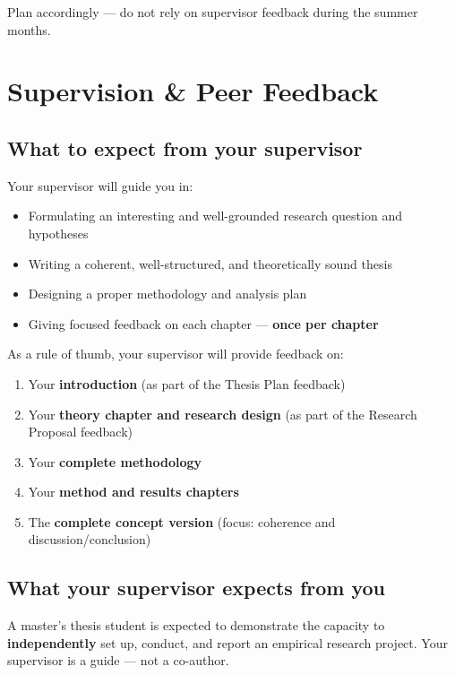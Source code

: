 \documentclass[
  11pt,
  a4paper,
]{scrbook}
\providecommand{\tightlist}{%
  \setlength{\itemsep}{0pt}\setlength{\parskip}{0pt}}\usepackage{longtable,booktabs,array}
\begin{document}
Plan accordingly --- do not rely on supervisor feedback during the
summer months.

\chapter{Supervision \& Peer Feedback}\label{supervision-peer-feedback}

\section{What to expect from your
supervisor}\label{what-to-expect-from-your-supervisor}

Your supervisor will guide you in:

\begin{itemize}
\tightlist
\item
  Formulating an interesting and well-grounded research question and
  hypotheses
\item
  Writing a coherent, well-structured, and theoretically sound thesis
\item
  Designing a proper methodology and analysis plan
\item
  Giving focused feedback on each chapter --- \textbf{once per chapter}
\end{itemize}

As a rule of thumb, your supervisor will provide feedback on:

\begin{enumerate}
\def\labelenumi{\arabic{enumi}.}
\tightlist
\item
  Your \textbf{introduction} (as part of the Thesis Plan feedback)
\item
  Your \textbf{theory chapter and research design} (as part of the
  Research Proposal feedback)
\item
  Your \textbf{complete methodology}
\item
  Your \textbf{method and results chapters}
\item
  The \textbf{complete concept version} (focus: coherence and
  discussion/conclusion)
\end{enumerate}

\section{What your supervisor expects from
you}\label{what-your-supervisor-expects-from-you}

A master's thesis student is expected to demonstrate the capacity to
\textbf{independently} set up, conduct, and report an empirical research
project. Your supervisor is a guide --- not a co-author.
\end{document}
